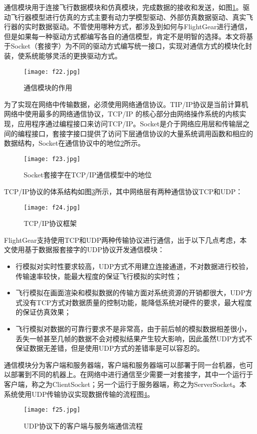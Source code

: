 \begin{enumerate}
通信模块用于连接飞行数据模块和仿真模块，完成数据的接收和发送，如图\ref{fig24}。驱动飞行器模型进行仿真的方式主要有动力学模型驱动、外部仿真数据驱动、真实飞行器的实时数据驱动。不管使用哪种方式，都涉及到如何与FlightGear进行通信，但是如果每一种驱动方式都编写各自的通信模型，肯定不是明智的选择。本文将基于Socket（套接字）为不同的驱动方式编写统一接口，实现对通信方式的模块化封装，使系统能够灵活的更换驱动方式。
\vspace{-10pt}
\begin{figure}[!ht]
\centering
\texttt{[image: f22.jpg]}
\caption{通信模块的作用}
\label{fig24}
\end{figure}

为了实现在网络中传输数据，必须使用网络通信协议。TIP/IP协议是当前计算机网络中使用最多的网络通信协议，TCP/IP 的核心部分由网络操作系统的内核实现，应用程序通过编程接口来访问TCP/IP。Socket是介于网络应用层和传输层之间的编程接口，套接字接口提供了访问下层通信协议的大量系统调用函数和相应的数据结构，Socket在通信协议中的地位\ref{fig25}所示。
\begin{figure}[!ht]
\centering
\texttt{[image: f23.jpg]}
\caption{Socket套接字在TCP/IP通信模型中的地位}
\label{fig25}
\end{figure}

TCP/IP协议的体系结构如图\ref{fig26}所示，其中网络层有两种通信协议TCP和UDP：
 \begin{figure}[!ht]
\centering
\texttt{[image: f24.jpg]}
\caption{TCP/IP协议框架}
\label{fig26}
\end{figure}

FlightGear支持使用TCP和UDP两种传输协议进行通信，出于以下几点考虑，本文使用基于数据报套接字的UDP协议开发通信模块：
\begin{itemize}
  \item 行模拟对实时性要求较高，UDP方式不用建立连接通道，不对数据进行校验，传输速率较快，能最大程度的保证飞行模拟的实时性；
  \item 飞行模拟在画面渲染和模拟数据的传输方面对系统资源的开销都很大，UDP方式没有TCP方式对数据质量的控制功能，能降低系统对硬件的要求，最大程度的保证仿真效果；
  \item 飞行模拟对数据的可靠行要求不是非常高，由于前后帧的模拟数据相差很小，丢失一帧甚至几帧的数据不会对模拟结果产生较大影响，因此虽然UDP方式不保证数据无差错，但是使用UDP方式的差错率是可以容忍的。

\end{itemize}

通信模块分为客户端和服务器端，客户端和服务器端可以部署于同一台机器，也可以部署到不同的机器上。在网络中进行通信至少需要一对套接字，其中一个运行于客户端，称之为ClientSocket；另一个运行于服务器端，称之为ServerSocket。本系统使用UDP传输协议实现数据传输的流程图\ref{fig27}。
 \begin{figure}[!ht]
\centering
\texttt{[image: f25.jpg]}
\caption{UDP协议下的客户端与服务端通信流程}
\label{fig27}
\end{figure}
\end{enumerate}
